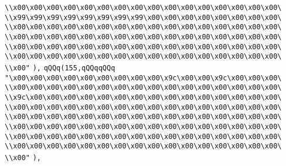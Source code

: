 \verb|\\x00\x00\x00\x00\x00\x00\x00\x00\x00\x00\x00\x00\x00\x00\x00\x00\|\newline
\verb|\\x99\x99\x99\x99\x99\x99\x99\x99\x00\x00\x00\x00\x00\x00\x00\x00\|\newline
\verb|\\x00\x00\x00\x00\x00\x00\x00\x00\x00\x00\x00\x00\x00\x00\x00\x00\|\newline
\verb|\\x00\x00\x00\x00\x00\x00\x00\x00\x00\x00\x00\x00\x00\x00\x00\x00\|\newline
\verb|\\x00\x00\x00\x00\x00\x00\x00\x00\x00\x00\x00\x00\x00\x00\x00\x00\|\newline
\verb|\\x00\x00\x00\x00\x00\x00\x00\x00\x00\x00\x00\x00\x00\x00\x00\x00\|\newline
\verb|\\x00"|\newline
\verb|),|\newline
\verb|qQQq(155,qQQqqQQq|\newline
\verb|"\x00\x00\x00\x00\x00\x00\x00\x00\x00\x9c\x00\x00\x9c\x00\x00\x00\|\newline
\verb|\\x00\x00\x00\x00\x00\x00\x00\x00\x00\x00\x00\x00\x00\x00\x00\x00\|\newline
\verb|\\x9c\x00\x00\x00\x00\x00\x00\x00\x00\x00\x00\x00\x00\x00\x00\x00\|\newline
\verb|\\x00\x00\x00\x00\x00\x00\x00\x00\x00\x00\x00\x00\x00\x00\x00\x00\|\newline
\verb|\\x00\x00\x00\x00\x00\x00\x00\x00\x00\x00\x00\x00\x00\x00\x00\x00\|\newline
\verb|\\x00\x00\x00\x00\x00\x00\x00\x00\x00\x00\x00\x00\x00\x00\x00\x00\|\newline
\verb|\\x00\x00\x00\x00\x00\x00\x00\x00\x00\x00\x00\x00\x00\x00\x00\x00\|\newline
\verb|\\x00\x00\x00\x00\x00\x00\x00\x00\x00\x00\x00\x00\x00\x00\x00\x00\|\newline
\verb|\\x00"|\newline
\verb|),|\newline
